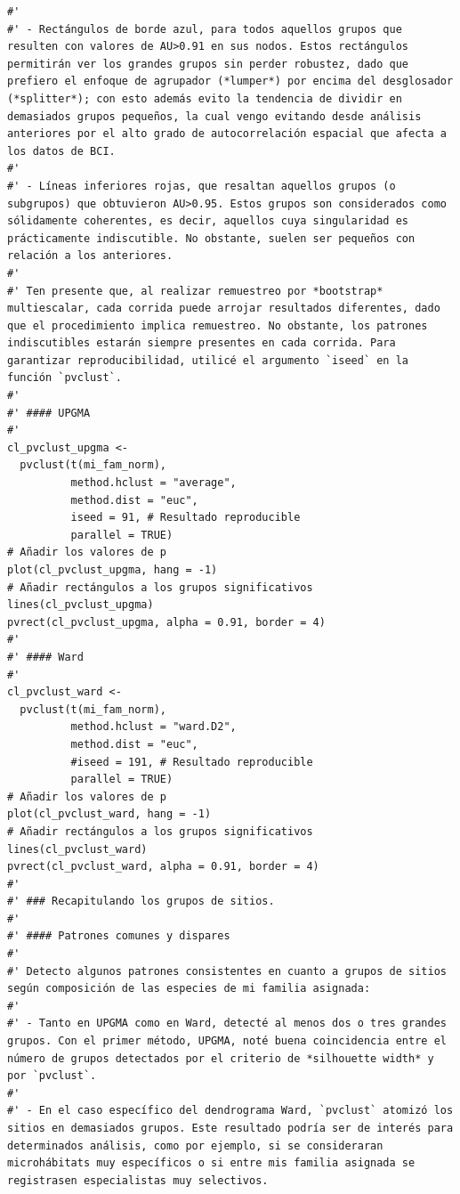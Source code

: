 \documentclass[11pt,]{article}
\begin{document}
\begin{verbatim}
#' 
#' - Rectángulos de borde azul, para todos aquellos grupos que resulten con valores de AU>0.91 en sus nodos. Estos rectángulos permitirán ver los grandes grupos sin perder robustez, dado que prefiero el enfoque de agrupador (*lumper*) por encima del desglosador (*splitter*); con esto además evito la tendencia de dividir en demasiados grupos pequeños, la cual vengo evitando desde análisis anteriores por el alto grado de autocorrelación espacial que afecta a los datos de BCI.
#' 
#' - Líneas inferiores rojas, que resaltan aquellos grupos (o subgrupos) que obtuvieron AU>0.95. Estos grupos son considerados como sólidamente coherentes, es decir, aquellos cuya singularidad es prácticamente indiscutible. No obstante, suelen ser pequeños con relación a los anteriores.
#' 
#' Ten presente que, al realizar remuestreo por *bootstrap* multiescalar, cada corrida puede arrojar resultados diferentes, dado que el procedimiento implica remuestreo. No obstante, los patrones indiscutibles estarán siempre presentes en cada corrida. Para garantizar reproducibilidad, utilicé el argumento `iseed` en la función `pvclust`.
#' 
#' #### UPGMA
#' 
cl_pvclust_upgma <-
  pvclust(t(mi_fam_norm),
          method.hclust = "average",
          method.dist = "euc",
          iseed = 91, # Resultado reproducible
          parallel = TRUE)
# Añadir los valores de p
plot(cl_pvclust_upgma, hang = -1)
# Añadir rectángulos a los grupos significativos
lines(cl_pvclust_upgma)
pvrect(cl_pvclust_upgma, alpha = 0.91, border = 4)
#' 
#' #### Ward
#' 
cl_pvclust_ward <-
  pvclust(t(mi_fam_norm),
          method.hclust = "ward.D2",
          method.dist = "euc",
          #iseed = 191, # Resultado reproducible
          parallel = TRUE)
# Añadir los valores de p
plot(cl_pvclust_ward, hang = -1)
# Añadir rectángulos a los grupos significativos
lines(cl_pvclust_ward)
pvrect(cl_pvclust_ward, alpha = 0.91, border = 4)
#' 
#' ### Recapitulando los grupos de sitios.
#' 
#' #### Patrones comunes y dispares
#' 
#' Detecto algunos patrones consistentes en cuanto a grupos de sitios según composición de las especies de mi familia asignada:
#' 
#' - Tanto en UPGMA como en Ward, detecté al menos dos o tres grandes grupos. Con el primer método, UPGMA, noté buena coincidencia entre el número de grupos detectados por el criterio de *silhouette width* y por `pvclust`.
#' 
#' - En el caso específico del dendrograma Ward, `pvclust` atomizó los sitios en demasiados grupos. Este resultado podría ser de interés para determinados análisis, como por ejemplo, si se consideraran microhábitats muy específicos o si entre mis familia asignada se registrasen especialistas muy selectivos.

\end{verbatim}
\end{document}

